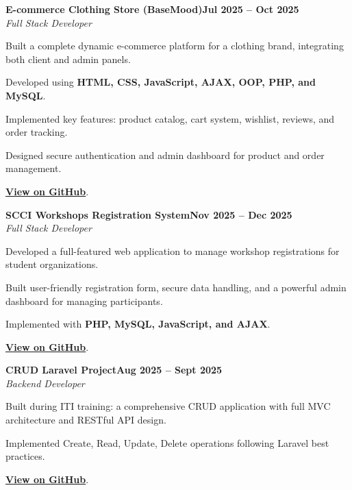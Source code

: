 \documentclass[letterpaper,10pt]{article}
\newcommand{\headingBf}[2]{\hspace{10pt}\textbf{#1}\hfill\textbf{#2}\\}
\newcommand{\headingIt}[2]{\hspace{10pt}\textit{#1}\hfill\textit{#2}\\}
\newenvironment{resume_list}{
  \vspace{-7pt}
  \begin{itemize}[itemsep=-2px, parsep=1pt, leftmargin=30pt]
}{
  \end{itemize}
}
\begin{document}
\headingBf{E-commerce Clothing Store (BaseMood)}{Jul 2025 -- Oct 2025}
\headingIt{Full Stack Developer}{}
\begin{resume_list}
  \item Built a complete dynamic e-commerce platform for a clothing brand, integrating both client and admin panels.
  \item Developed using \textbf{HTML, CSS, JavaScript, AJAX, OOP, PHP, and MySQL}.
  \item Implemented key features: product catalog, cart system, wishlist, reviews, and order tracking.
  \item Designed secure authentication and admin dashboard for product and order management.
  \item \href{https://github.com/mahmoud530/BaseMood}{\textbf{View on GitHub}}.
\end{resume_list}

\headingBf{SCCI Workshops Registration System}{Nov 2025 -- Dec 2025}
\headingIt{Full Stack Developer}{}
\begin{resume_list}
  \item Developed a full-featured web application to manage workshop registrations for student organizations.
  \item Built user-friendly registration form, secure data handling, and a powerful admin dashboard for managing participants.
  \item Implemented with \textbf{PHP, MySQL, JavaScript, and AJAX}.
  \item \href{https://github.com/mahmoud530/SCCI-Workshops-Registration-System}{\textbf{View on GitHub}}.
\end{resume_list}

\headingBf{CRUD Laravel Project}{Aug 2025 -- Sept 2025}
\headingIt{Backend Developer}{}
\begin{resume_list}
  \item Built during ITI training: a comprehensive CRUD application with full MVC architecture and RESTful API design.
  \item Implemented Create, Read, Update, Delete operations following Laravel best practices.
  \item \href{https://github.com/mahmoud530/CRUD-Laravel-Project}{\textbf{View on GitHub}}.
\end{resume_list}
\end{document}
